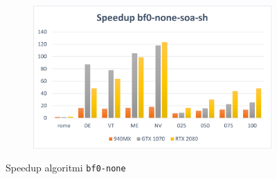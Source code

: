 \documentclass[12pt,a4paper,oneside]{book}
\begin{document}
\begin{figure}[b]
\begin{subfigure}{.5\textwidth}
		\end{subfigure}%
		\begin{subfigure}{.5\textwidth}
			\centering
			\includegraphics[width=\textwidth]{speedup_bf0-none-soa-sh}
		\end{subfigure}
		\caption{Speedup algoritmi \texttt{bf0-none}}
		\label{fig:speedup_bf0-none}
	\end{figure}
\end{document}
